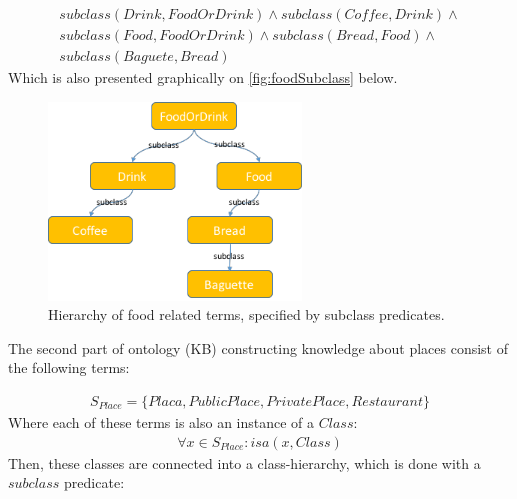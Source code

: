 \begin{equation}\label{as:kbFoodSubclasses}
\begin{gathered}
    subclass(Drink,FoodOrDrink) \land subclass(Coffee,Drink) \land \\
	subclass(Food,FoodOrDrink) \land subclass(Bread,Food) \land \\
	subclass(Baguete, Bread)
\end{gathered}
\end{equation}
Which is also presented graphically on \autoref{fig:foodSubclass} below.
\begin{figure}[H]
	\centering
		\includegraphics[width=0.6\textwidth]{figures/foodOntology.png}
	\caption{Hierarchy of food related terms, specified by subclass predicates.}
	\label{fig:foodSubclass}
\end{figure}

The second part of ontology (KB) constructing knowledge about places consist
of the following terms:

\begin{equation}\label{set:placeTerms}
\begin{gathered}
S_{Place} = \{Placa,PublicPlace,PrivatePlace,Restaurant\}
\end{gathered}
\end{equation}
Where each of these terms is also an instance of a $Class$:
\begin{equation}\label{set:placeTermsClass}
\begin{gathered}
\forall x \in S_{Place}: isa(x,Class)
\end{gathered}
\end{equation}
Then, these classes are connected into a class-hierarchy, which is done with
a $subclass$ predicate:

